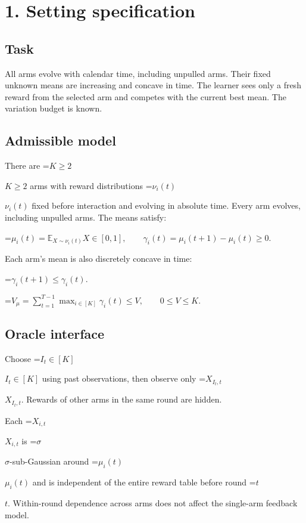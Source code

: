 \documentclass[10pt,a4paper]{article}
\newcommand{\AtlasMath}[1]{\par\begingroup\centering\setbox0=\hbox{$\displaystyle #1$}\ifdim\wd0>1.4\linewidth\typeout{ATLAS WIDE FORMULA: \the\wd0}\fi\ifdim\wd0>\linewidth\resizebox{\linewidth}{!}{\box0}\else\box0\fi\par\endgroup}
\newcommand{\AtlasInlineMath}[1]{\begingroup\setbox0=\hbox{$#1$}\ifdim\wd0>.4\linewidth\endgroup\AtlasMath{#1}\else\endgroup$#1$\fi}
\begin{document}
\section{1. Setting specification}


\subsection{Task}


All arms evolve with calendar time, including unpulled arms. Their fixed unknown means are increasing and concave in time. The learner sees only a fresh reward from the selected arm and competes with the current best mean. The variation budget is known.



\subsection{Admissible model}


There are \AtlasInlineMath{K\ge2} arms with reward distributions \AtlasInlineMath{\nu_i(t)} fixed before interaction and evolving in absolute time. Every arm evolves, including unpulled arms. The means satisfy:




\AtlasMath{\mu_i(t)=\mathbb{E}_{X\sim\nu_i(t)}X\in[0,1],\qquad \gamma_i(t)=\mu_i(t+1)-\mu_i(t)\ge0.}




Each arm’s mean is also discretely concave in time:




\AtlasMath{\gamma_i(t+1)\le\gamma_i(t).}





\AtlasMath{V_\mu=\sum_{t=1}^{T-1}\max_{i\in[K]}\gamma_i(t)\le V,\qquad 0\le V\le K.}




\subsection{Oracle interface}


Choose \AtlasInlineMath{I_t\in[K]} using past observations, then observe only \AtlasInlineMath{X_{I_t,t}}. Rewards of other arms in the same round are hidden.



Each \AtlasInlineMath{X_{i,t}} is \AtlasInlineMath{\sigma}-sub-Gaussian around \AtlasInlineMath{\mu_i(t)} and is independent of the entire reward table before round \AtlasInlineMath{t}. Within-round dependence across arms does not affect the single-arm feedback model.
\end{document}

